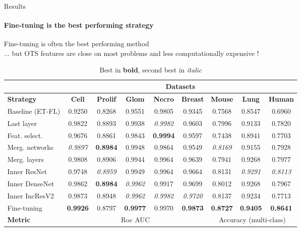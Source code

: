 \documentclass{beamer}
\begin{document}
\begin{frame}{Results}
\framesubtitle{Fine-tuning is the best performing strategy}

\begin{center}
	{Fine-tuning} is often the best performing method \\
	... but {OTS features} are {close} on most problems and {less computationally expensive} !
\end{center}
\vfill
\begin{table}
	\center
	\tiny
	\begin{tabular}{l|ccccc|ccc}   
	  & \multicolumn{8}{c}{\textbf{Datasets}} \\
	  \hline 
	  \textbf{Strategy} & \textbf{Cell} & \textbf{Prolif} & \textbf{Glom} & \textbf{Necro} & \textbf{Breast} & \textbf{Mouse} & \textbf{Lung} & \textbf{Human} \\
	  \hline
	  Baseline (ET-FL)      & {0.9250} & {0.8268} & {0.9551} & {0.9805}	& {0.9345} & {0.7568} & {0.8547} & {0.6960} \\
	  Last layer    & {0.9822} & {0.8893} & {0.9938} & \textit{0.9982} & {0.9603} & {0.7996} & {0.9133}	& {0.7820} \\
	  Feat. select.	& {0.9676}	& {0.8861}	& {0.9843}	& \textbf{0.9994}	& {0.9597}	& {0.7438}	& {0.8941}	& {0.7703} \\
	  Merg. networks	& \textit{0.9897}	& \textbf{0.8984}	& {0.9948}	& {0.9864}	& {0.9549}	& \textit{0.8169}	& {0.9155}	& {0.7928} \\
	  Merg. layers	& {0.9808}	& {0.8906}	& {0.9944}	& {0.9964}	& {0.9639}	& {0.7941}	& {0.9268}	& {0.7977} \\
	  Inner ResNet	& {0.9748}	& \textit{0.8959}	& {0.9949}	& {0.9964}	& {0.9664}	& {0.8131}	& \textit{0.9291}	& \textit{0.8113} \\
	  Inner DenseNet	& {0.9862}	& \textbf{0.8984}	& \textit{0.9962}	& {0.9917}	& {0.9699}	& {0.8012}	& {0.9268}	& {0.7967} \\
	  Inner IncResV2	& {0.9873}	& {0.8948}	& \textit{0.9962}	& \textit{0.9982}	& \textit{0.9720}	& {0.8137}	& {0.9234}	& {0.7713} \\
	   {Fine-tuning}		& \textbf{0.9926}	& {0.8797}	& \textbf{0.9977}	& {0.9970}	& \textbf{0.9873}	& \textbf{0.8727}	& \textbf{0.9405}	& \textbf{0.8641} \\
	  \hline
	  \textbf{Metric} & \multicolumn{5}{c|}{Roc AUC} & \multicolumn{3}{c}{Accuracy (multi-class)} \\
	\end{tabular}
	\caption{\footnotesize Best in \textbf{bold}, second best in \textit{italic}}
\end{table}
\end{frame}
\end{document}

